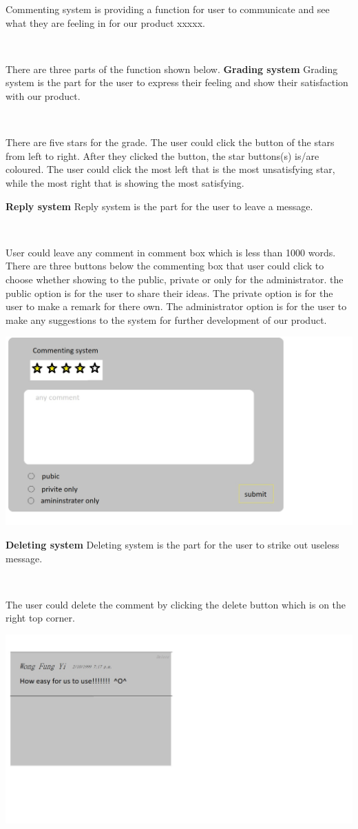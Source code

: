 Commenting system is providing a function for user to communicate and see what they are feeling in for our product xxxxx.\par~

There are three parts of the function shown below.
\textbf{Grading system}
Grading system is the part for the user to express their feeling and show their satisfaction with our product.\par~

There are five stars for the grade. The user could click the button of the stars from left to right. After they clicked the button, the star buttons(s) is/are coloured. The user could click the most left that is the most unsatisfying star, while the most right that is showing the most satisfying.

\textbf{Reply system}
Reply system is the part for the user to leave a message.\par~

User could leave any comment in comment box which is less than 1000 words. There are three buttons below the commenting box that user could click to choose whether showing to the public, private or only for the administrator. the public option is for the user to share their ideas. The private option is for the user to make a remark for there own. The administrator option is for the user to make any suggestions to the system for further development of our product.

\includegraphics[scale=0.5]{Doc/Graphics/sdfg}

\textbf{Deleting system}
Deleting system is the part for the user to strike out useless message.\par~

The user could delete the comment by clicking the delete button which is on the right top corner.

\includegraphics[scale=0.5]{Doc/Graphics/asdf}
